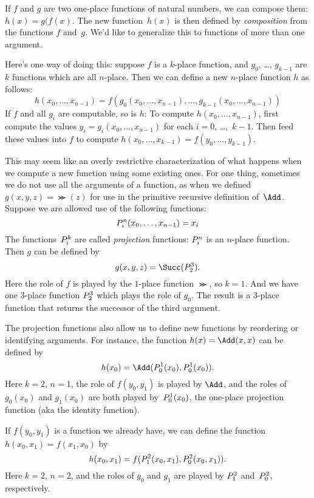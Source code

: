 \documentclass[../../../include/open-logic-section]{subfiles}
\begin{document}

If $f$ and $g$ are two one-place functions of natural numbers, we can
compose them: $h(x) = g(f(x)$. The new
function~$h(x)$ is then defined by \emph{composition} from the
functions $f$ and~$g$. We'd like to generalize this to functions of
more than one argument.

Here's one way of doing this: suppose $f$ is a $k$-place function,
and $g_0$, \dots, $g_{k-1}$ are $k$ functions which are all
$n$-place. Then we can define a new $n$-place function $h$ as follows:
\[
h(x_0, \dots, x_{n-1}) =
f(g_0(x_0, \dots, x_{n-1}), \dots, g_{k-1}(x_0, \dots, x_{n-1}))
\]
If $f$ and all $g_i$ are computable, so is $h$: To compute $h(x_0,
\dots, x_{n-1})$, first compute the values $y_i = g_i(x_0, \dots,
x_{n-1})$ for each $i = 0$, \dots,~$k-1$. Then feed these values into
$f$ to compute $h(x_0, \dots, x_{k-1}) = f(y_0, \dots, y_{k-1})$.

This may seem like an overly restrictive characterization of what
happens when we compute a new function using some existing ones. For
one thing, sometimes we do not use all the arguments of a function, as
when we defined $g(x, y, z) = \Succ(z)$ for use in the primitive
recursive definition of~$\Add$. Suppose we are allowed use of the
following functions:
\[
P^{n}_{i}(x_0, \dots, x_{n-1}) = x_i
\]
The functions~$P^{k}_{i}$ are called \emph{projection} functions:
$P^{n}_{i}$ is an $n$-place function. Then $g$ can be defined by
\[
g(x, y, z) = \Succ(\Proj{3}{2}).
\]
Here the role of $f$ is played by the $1$-place function $\Succ$, so
$k=1$. And we have one $3$-place function $P^{3}_{2}$ which plays
the role of $g_0$. The result is a $3$-place function that returns the
successor of the third argument.

The projection functions also allow us to define new functions by
reordering or identifying arguments. For instance, the function $h(x)
= \Add(x, x)$ can be defined by
\[
h(x_0) = \Add(\Proj{1}{0}(x_0),\Proj{1}{0}(x_0)).
\]
Here $k=2$, $n=1$, the role of $f(y_0,y_1)$ is played by $\Add$, and
the roles of $g_0(x_0)$ and $g_1(x_0)$ are both played
by~$P^{1}_{0}(x_0)$, the one-place projection function (aka the
identity function).

If $f(y_0, y_1)$ is a function we already have, we can define the
function $h(x_0, x_1) = f(x_1, x_0)$ by
\[
h(x_0, x_1) = f(P^{2}_{1}(x_0, x_1),P^{2}_{0}(x_0, x_1)).
\]
Here $k=2$, $n = 2$, and the roles of $g_0$ and $g_1$ are played by
$P^{2}_{1}$ and~$P^{2}_{0}$, respectively.
\end{document}
